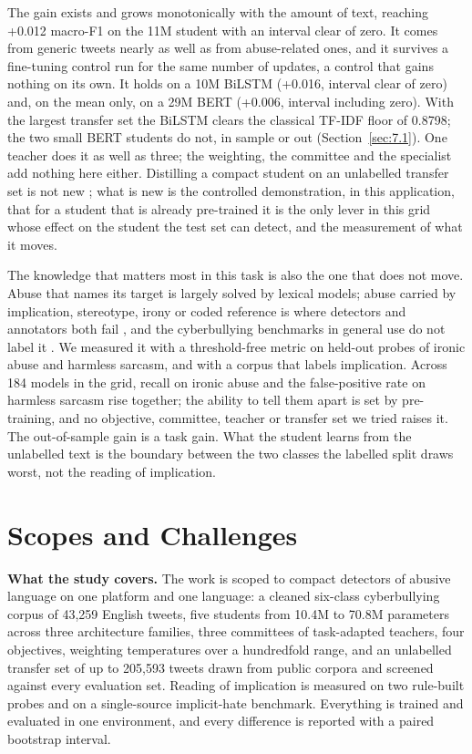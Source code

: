 The gain exists and grows monotonically with the amount of text, reaching +0.012 macro-F1 on the 11M
student with an interval clear of zero. It comes from generic tweets nearly as well as from
abuse-related ones, and it survives a fine-tuning control run for the same number of updates, a
control that gains nothing on its own. It holds on a 10M BiLSTM (+0.016, interval clear of zero)
and, on the mean only, on a 29M BERT (+0.006, interval including zero). With the largest transfer
set the BiLSTM clears the classical TF-IDF floor of 0.8798; the two small BERT students do not, in
sample or out (Section~\ref{sec:7.1}). One teacher does it as well as three; the weighting, the
committee and the specialist add nothing here either. Distilling a compact student on an unlabelled
transfer set is not new \cite{hinton2015distilling, turc2019wellread, tang2019distilling}; what is
new is the controlled demonstration, in this application, that for a student that is already
pre-trained it is the only lever in this grid whose effect on the student the test set can detect,
and the measurement of what it moves.

The knowledge that matters most in this task is also the one that does not move. Abuse that names
its target is largely solved by lexical models; abuse carried by implication, stereotype, irony or
coded reference is where detectors and annotators both fail \cite{elsherief2021latent,
ocampo2023indepth, hartvigsen2022toxigen}, and the cyberbullying benchmarks in general use do not
label it \cite{wang2020sosnet, wulczyn2017exmachina}. We measured it with a threshold-free metric on
held-out probes of ironic abuse and harmless sarcasm, and with a corpus that labels implication.
Across 184 models in the grid, recall on ironic abuse and the false-positive rate on harmless
sarcasm rise together; the ability to tell them apart is set by pre-training, and no objective,
committee, teacher or transfer set we tried raises it. The out-of-sample gain is a task gain. What
the student learns from the unlabelled text is the boundary between the two classes the labelled
split draws worst, not the reading of implication.

\section{Scopes and Challenges}
\label{sec:1.scope}
\textbf{What the study covers.} The work is scoped to compact detectors of abusive language on one
platform and one language: a cleaned six-class cyberbullying corpus of 43,259 English tweets, five
students from 10.4M to 70.8M parameters across three architecture families, three committees of
task-adapted teachers, four objectives, weighting temperatures over a hundredfold range, and an
unlabelled transfer set of up to 205,593 tweets drawn from public corpora and screened against every
evaluation set. Reading of implication is measured on two rule-built probes and on a single-source
implicit-hate benchmark. Everything is trained and evaluated in one environment, and every difference
is reported with a paired bootstrap interval.


